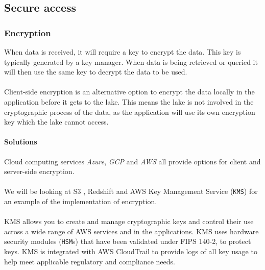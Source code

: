 \documentclass[10pt]{article}
\begin{document}
\subsection{Secure access}
\label{sec:secure_access}

\subsubsection{Encryption}

When data is received, it will require a key to encrypt the data. This key is typically generated by a key manager. When data is being retrieved or queried it will then use the same key to decrypt the data to be used.
\\ \\
Client-side encryption is an alternative option to encrypt the data locally in the application before it gets to the lake. This means the lake is not involved in the cryptographic process of the data, as the application will use its own encryption key which the lake cannot access.
\paragraph{Solutions} 
Cloud computing services \textit{Azure}, \textit{GCP} and \textit{AWS} all provide options for client and server-side encryption.
\\ \\
We will be looking at S3 \cite{encryption-in-s3}, Redshift \cite{encryption-in-redshift} and AWS Key Management Service (\texttt{KMS}) for an example of the implementation of encryption.\\\\KMS allows you to create and manage cryptographic keys and control their use across a wide range of AWS services and in the applications. KMS uses hardware security modules (\texttt{HSM}s) that have been validated under FIPS 140-2, to protect keys. KMS is integrated with AWS CloudTrail to provide logs of all key usage to help meet applicable regulatory and compliance needs. \cite{aws-kms}
\end{document}
